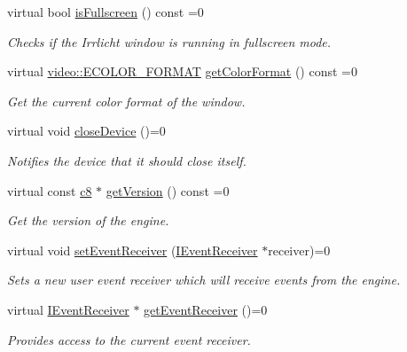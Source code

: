 \begin{DoxyCompactItemize}
virtual bool \hyperlink{classirr_1_1IrrlichtDevice_a7bf2f6fbe570ea99d16671507afd2340}{is\+Fullscreen} () const  =0
\begin{DoxyCompactList}\small\item\em Checks if the Irrlicht window is running in fullscreen mode. \end{DoxyCompactList}\item 
virtual \hyperlink{namespaceirr_1_1video_a1d5e487888c32b1674a8f75116d829ed}{video\+::\+E\+C\+O\+L\+O\+R\+\_\+\+F\+O\+R\+M\+AT} \hyperlink{classirr_1_1IrrlichtDevice_a13536e5f401b299650a704e120cdb26b}{get\+Color\+Format} () const  =0
\begin{DoxyCompactList}\small\item\em Get the current color format of the window. \end{DoxyCompactList}\item 
virtual void \hyperlink{classirr_1_1IrrlichtDevice_a08c97937e0f60f98d443b397a7c60e18}{close\+Device} ()=0
\begin{DoxyCompactList}\small\item\em Notifies the device that it should close itself. \end{DoxyCompactList}\item 
virtual const \hyperlink{namespaceirr_a9395eaea339bcb546b319e9c96bf7410}{c8} $\ast$ \hyperlink{classirr_1_1IrrlichtDevice_a3eb1c2ab5b89607eab6ff67f3a236b3d}{get\+Version} () const  =0
\begin{DoxyCompactList}\small\item\em Get the version of the engine. \end{DoxyCompactList}\item 
virtual void \hyperlink{classirr_1_1IrrlichtDevice_abf71a5ed6bb6b287e769f699010cedf0}{set\+Event\+Receiver} (\hyperlink{classirr_1_1IEventReceiver}{I\+Event\+Receiver} $\ast$receiver)=0
\begin{DoxyCompactList}\small\item\em Sets a new user event receiver which will receive events from the engine. \end{DoxyCompactList}\item 
virtual \hyperlink{classirr_1_1IEventReceiver}{I\+Event\+Receiver} $\ast$ \hyperlink{classirr_1_1IrrlichtDevice_a26227e20e46915942d067532c61df42b}{get\+Event\+Receiver} ()=0
\begin{DoxyCompactList}\small\item\em Provides access to the current event receiver. \end{DoxyCompactList}\item 

\end{DoxyCompactItemize}
